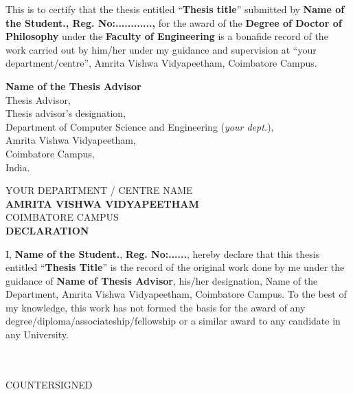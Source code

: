 \documentclass[a4paper, 12pt]{report}
\theoremstyle{definition}
\begin{document}
	\noindent This is to certify that the thesis entitled \enquote{\textbf{Thesis title}} submitted by \textbf{Name of the Student., Reg. No:............,} for the award of the \textbf{Degree of Doctor of Philosophy} under the \textbf{Faculty of Engineering} is a bonafide record of the work carried out by him/her under my guidance and supervision at \enquote{your department/centre}, Amrita Vishwa Vidyapeetham, Coimbatore Campus.\\
	\vspace*{0.5cm}
	\vfill
\begin{center}
		\textbf{Name of the Thesis Advisor}\\
	Thesis Advisor,\\
	Thesis advisor's designation,\\
	Department of Computer Science and Engineering (\textit{your dept.}),\\
	Amrita Vishwa Vidyapeetham,\\
	Coimbatore Campus,\\
	India.
\end{center}

	\newpage
	\begin{center}
	{\large YOUR DEPARTMENT / CENTRE NAME}\\
	\Large{ \textbf{AMRITA VISHWA VIDYAPEETHAM}}\\

	{\large COIMBATORE CAMPUS}\\
		
	
		\vspace*{2.5cm}
		\large {\textbf{DECLARATION}}
		\vspace*{.3cm}
	\end{center}
	
	\noindent I,\textbf{ Name of the Student.},  \textbf{Reg. No:......}, hereby declare that this thesis entitled \enquote{\textbf{Thesis Title}} is the record of the original work done by me under the guidance of \textbf{Name of Thesis Advisor}, his/her designation, Name of the Department, Amrita Vishwa Vidyapeetham, Coimbatore Campus. To the best of my knowledge, this work has not formed the basis for the award of any degree/diploma/associateship/fellowship or a similar award to any candidate in any University.\\\\
	
	\vspace*{1cm}
	 \\
	\vfill
	\begin{center}
		\large{COUNTERSIGNED}\\
	\end{center}
	\vspace{0.6in}
	
\end{document}
